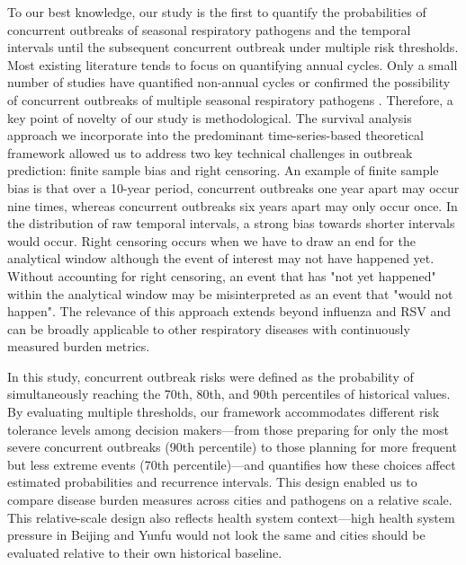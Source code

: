 To our best knowledge, our study is the first to quantify the probabilities of concurrent outbreaks of seasonal respiratory pathogens and the temporal intervals until the subsequent concurrent outbreak under multiple risk thresholds.
Most existing literature tends to focus on quantifying annual cycles.
Only a small number of studies have quantified non-annual cycles \citep{Yang2023, Li2025} or confirmed the possibility of concurrent outbreaks of multiple seasonal respiratory pathogens \citep{Pei2020, Eales2025}.
Therefore, a key point of novelty of our study is methodological.
The survival analysis approach we incorporate into the predominant time-series-based theoretical framework allowed us to address two key technical challenges in outbreak prediction: finite sample bias and right censoring.
An example of finite sample bias is that over a 10-year period, concurrent outbreaks one year apart may occur nine times, whereas concurrent outbreaks six years apart may only occur once. 
In the distribution of raw temporal intervals, a strong bias towards shorter intervals would occur.
Right censoring occurs when we have to draw an end for the analytical window although the event of interest may not have happened yet.
Without accounting for right censoring, an event that has "not yet happened" within the analytical window may be misinterpreted as an event that "would not happen".
The relevance of this approach extends beyond influenza and RSV and can be broadly applicable to other respiratory diseases with continuously measured burden metrics.

In this study, concurrent outbreak risks were defined as the probability of simultaneously reaching the 70th, 80th, and 90th percentiles of historical values.
By evaluating multiple thresholds, our framework accommodates different risk tolerance levels among decision makers—from those preparing for only the most severe concurrent outbreaks (90th percentile) to those planning for more frequent but less extreme events (70th percentile)—and quantifies how these choices affect estimated probabilities and recurrence intervals.
This design enabled us to compare disease burden measures across cities and pathogens on a relative scale.
This relative-scale design also reflects health system context—high health system pressure in Beijing and Yunfu would not look the same and cities should be evaluated relative to their own historical baseline.

